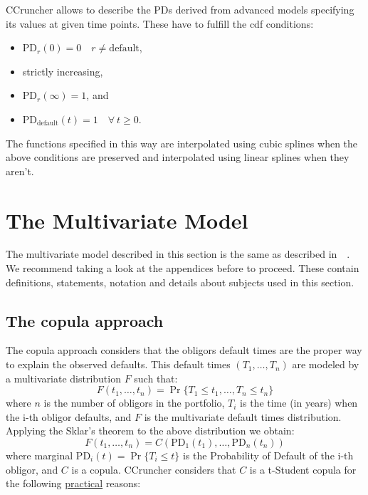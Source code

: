 \documentclass[11pt,fleqn]{book} %
\begin{document}
CCruncher allows to describe the PDs derived from advanced models specifying 
its values at given time points. These have to fulfill the cdf conditions:
\begin{itemize}
	\item $\text{PD}_r(0) = 0 \quad r \ne \text{default}$,
	\item strictly increasing, 
	\item $\text{PD}_r(\infty) = 1$, and
	\item $\text{PD}_{\text{default}}(t) = 1 \quad \forall\ t \ge 0$.
\end{itemize}
The functions specified in this way are interpolated using cubic splines
when the above conditions are preserved and interpolated using linear splines 
when they aren't.


\section{The Multivariate Model}

The multivariate model described in this section is the same as described 
in~\cite{li:2000,roncalli:2001,frey:2001}~\cite[chap. 2.6]{bluhm:2002}.
We recommend taking a look at the appendices before to proceed.
These contain definitions, statements, notation and details about subjects 
used in this section.

\subsection{The copula approach}
The copula approach considers that the obligors default times are the 
proper way to explain the observed defaults. This default times 
$(T_1, \dots, T_n)$ are modeled by a multivariate distribution $F$ 
such that:
\begin{displaymath}
	F(t_1, \dots, t_n) = \Pr \{T_1 \le t_1, \dots, T_n \le t_n\}
\end{displaymath}
where $n$ is the number of obligors in the portfolio, $T_i$ is the time 
(in years) when the i-th obligor defaults, and $F$ is the multivariate
default times distribution. Applying the Sklar's theorem to the above 
distribution we obtain:
\begin{displaymath}
	F(t_1, \dots, t_n) = 
	C\left(\text{PD}_1(t_1), \dots, \text{PD}_n(t_n)\right)
\end{displaymath}
where marginal $\text{PD}_i(t) = \Pr\{T_i \le t\}$ is the Probability 
of Default of the i-th obligor, and $C$ is a copula. CCruncher considers 
that $C$ is a t-Student copula for the following \ul{practical} reasons:
\end{document}
